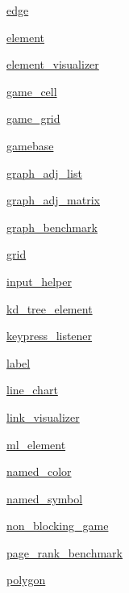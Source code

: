 \begin{DoxyCompactItemize}
\item 
 \mbox{\hyperlink{namespacebridges_1_1edge}{edge}}
\item 
 \mbox{\hyperlink{namespacebridges_1_1element}{element}}
\item 
 \mbox{\hyperlink{namespacebridges_1_1element__visualizer}{element\+\_\+visualizer}}
\item 
 \mbox{\hyperlink{namespacebridges_1_1game__cell}{game\+\_\+cell}}
\item 
 \mbox{\hyperlink{namespacebridges_1_1game__grid}{game\+\_\+grid}}
\item 
 \mbox{\hyperlink{namespacebridges_1_1gamebase}{gamebase}}
\item 
 \mbox{\hyperlink{namespacebridges_1_1graph__adj__list}{graph\+\_\+adj\+\_\+list}}
\item 
 \mbox{\hyperlink{namespacebridges_1_1graph__adj__matrix}{graph\+\_\+adj\+\_\+matrix}}
\item 
 \mbox{\hyperlink{namespacebridges_1_1graph__benchmark}{graph\+\_\+benchmark}}
\item 
 \mbox{\hyperlink{namespacebridges_1_1grid}{grid}}
\item 
 \mbox{\hyperlink{namespacebridges_1_1input__helper}{input\+\_\+helper}}
\item 
 \mbox{\hyperlink{namespacebridges_1_1kd__tree__element}{kd\+\_\+tree\+\_\+element}}
\item 
 \mbox{\hyperlink{namespacebridges_1_1keypress__listener}{keypress\+\_\+listener}}
\item 
 \mbox{\hyperlink{namespacebridges_1_1label}{label}}
\item 
 \mbox{\hyperlink{namespacebridges_1_1line__chart}{line\+\_\+chart}}
\item 
 \mbox{\hyperlink{namespacebridges_1_1link__visualizer}{link\+\_\+visualizer}}
\item 
 \mbox{\hyperlink{namespacebridges_1_1ml__element}{ml\+\_\+element}}
\item 
 \mbox{\hyperlink{namespacebridges_1_1named__color}{named\+\_\+color}}
\item 
 \mbox{\hyperlink{namespacebridges_1_1named__symbol}{named\+\_\+symbol}}
\item 
 \mbox{\hyperlink{namespacebridges_1_1non__blocking__game}{non\+\_\+blocking\+\_\+game}}
\item 
 \mbox{\hyperlink{namespacebridges_1_1page__rank__benchmark}{page\+\_\+rank\+\_\+benchmark}}
\item 
 \mbox{\hyperlink{namespacebridges_1_1polygon}{polygon}}

\end{DoxyCompactItemize}
